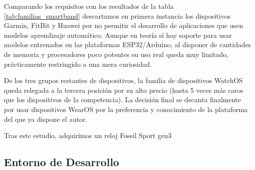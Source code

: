 
Comparando los requisitos con los resultados de la tabla \ref{tab:familias_smartband} descartamos en primera instancia los dispositivos Garmin, FitBit y Huawei por no permitir el desarrollo de aplicaciones que usen modelos aprendizaje automático. Aunque en teoría sí hay soporte para usar modelos entrenados en las plataformas ESP32/Arduino, al disponer de cantidades de memoria y procesadores poco potentes su uso real queda muy limitado, prácticamente restringido a una mera curiosidad. 

De los tres grupos restantes de dispositivos, la familia de dispositivos WatchOS queda relegada a la tercera posición por su alto precio (hasta 5 veces más caros que los dispositivos de la competencia). La decisión final se decanta finalmente por usar dispositivos WearOS por la preferencia y conocimiento de la plataforma del que ya dispone el autor. 

Tras este estudio, adquirimos un reloj Fossil Sport gen3 

\subsection{Entorno de Desarrollo}

